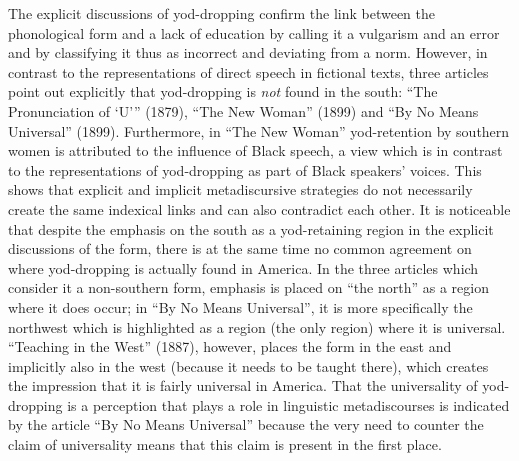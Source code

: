 The explicit discussions of yod-dropping confirm the link between the phonological form and a lack of education by calling it a vulgarism and an error and by classifying it thus as incorrect and deviating from a norm. However, in contrast to the representations of direct speech in fictional texts, three articles point out explicitly that yod-dropping is \emph{not} found in the south: “The Pronunciation of ‘U’” (1879), “The New Woman” (1899) and “By No Means Universal” (1899). Furthermore, in “The New Woman” yod-retention by southern women is attributed to the influence of Black speech, a view which is in contrast to the representations of yod-dropping as part of Black speakers’ voices. This shows that explicit and implicit metadiscursive strategies do not necessarily create the same indexical links and can also contradict each other. It is noticeable that despite the emphasis on the south as a yod-retaining region in the explicit discussions of the form, there is at the same time no common agreement on where yod-dropping is actually found in America. In the three articles which consider it a non-southern form, emphasis is placed on “the north” as a region where it does occur; in “By No Means Universal”, it is more specifically the northwest which is highlighted as a region (the only region) where it is universal. “Teaching in the West” (1887), however, places the form in the east and implicitly also in the west (because it needs to be taught there), which creates the impression that it is fairly universal in America. That the universality of yod-dropping is a perception that plays a role in linguistic metadiscourses is indicated by the article “By No Means Universal” because the very need to counter the claim of universality means that this claim is present in the first place.


